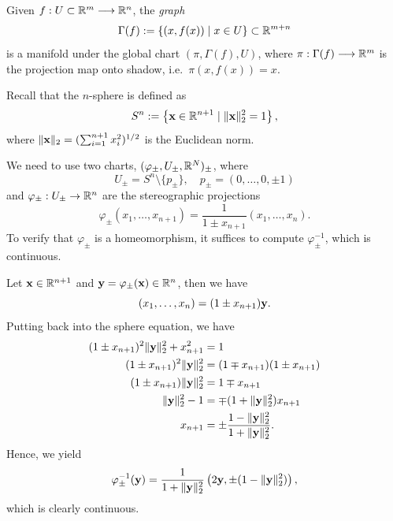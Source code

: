 \begin{example}
  Given \(f:U\subset\mathbb{R}^m\longrightarrow\mathbb{R}^n\), the \emph{graph} \[
      \Gamma(f) := \left\{(x,f(x))\mid x\in U\right\}\subset\mathbb{R}^{m+n}
    \] is a manifold under the global chart \((\pi,\Gamma(f),U)\), where \(\pi:\Gamma(f)\longrightarrow\mathbb{R}^m\) is the projection map onto shadow, i.e.\ \(\pi(x,f(x)) = x\).
\end{example}

\begin{example}[Spheres \(S^n\)]
  Recall that the \(n\)-sphere is defined as \[
    S^n := \left\{\mathbf{x}\in\mathbb{R}^{n+1} \mid \|\mathbf{x}\|_2^2 = 1 \right\},
  \] where \(\|\mathbf{x}\|_2 = (\sum_{i=1}^{n+1} x_i^2)^{1/2}\) is the Euclidean norm.

  \begin{center}
    
  \end{center}
  
  We need to use two charts, \((\varphi_\pm,U_\pm,\mathbb{R}^N)_\pm\), where \[
    U_\pm = S^n\setminus\{p_\pm\}
    ,\quad
    p_\pm = (0,\ldots,0,\pm 1)
  \] and \(\varphi_\pm:U_\pm\to\mathbb{R}^n\) are the stereographic projections \[
    \varphi_\pm(x_1,\ldots,x_{n+1}) = \frac{1}{1\pm x_{n+1}}(x_1,\ldots,x_n).
  \]
  To verify that \(\varphi_\pm\) is a homeomorphism, it suffices to compute \(\varphi_\pm^{-1}\), which is continuous.
  \begin{roof}
    Let \(\mathbf{x}\in\mathbb{R}^{n+1}\) and \(\mathbf{y} = \varphi_{\pm}(\mathbf{x})\in\mathbb{R}^n\), then we have \[
      (x_1,\ldots,x_n) = (1\pm x_{n+1})\mathbf{y}.
    \]
    Putting back into the sphere equation, we have \begin{align*}
      (1\pm x_{n+1})^2\|\mathbf{y}\|_2^2 + x_{n+1}^2 &= 1 \\
      (1\pm x_{n+1})^2\|\mathbf{y}\|_2^2 &= (1\mp x_{n+1})(1\pm x_{n+1}) \\
      (1\pm x_{n+1})\|\mathbf{y}\|_2^2 &= 1\mp x_{n+1} \\
      \|\mathbf{y}\|_2^2 - 1 &= \mp (1 + \|\mathbf{y}\|_2^2)x_{n+1} \\
      x_{n+1} &= \pm \frac{1 - \|\mathbf{y}\|_2^2}{1 + \|\mathbf{y}\|_2^2}.
    \end{align*}
    Hence, we yield \[
      \varphi_\pm^{-1}(\mathbf{y}) = \frac{1}{1 + \|\mathbf{y}\|_2^2}\left(2\mathbf{y}, \pm(1 - \|\mathbf{y}\|_2^2)\right),
    \] which is clearly continuous.
  \end{roof}
\end{example}


